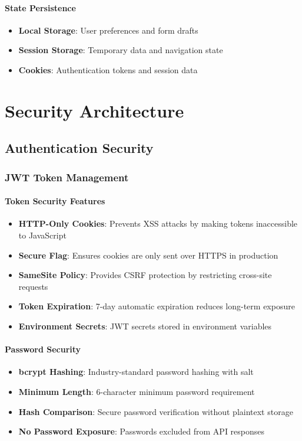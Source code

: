 \documentclass[12pt,a4paper]{article}
\begin{document}
\paragraph{State Persistence}
\begin{itemize}
\item \textbf{Local Storage}: User preferences and form drafts
\item \textbf{Session Storage}: Temporary data and navigation state
\item \textbf{Cookies}: Authentication tokens and session data
\end{itemize}

\section{Security Architecture}
\label{sec:security-architecture}

\subsection{Authentication Security}
\label{subsec:auth-security}

\subsubsection{JWT Token Management}
\label{subsubsec:jwt-security}

\paragraph{Token Security Features}
\begin{itemize}
\item \textbf{HTTP-Only Cookies}: Prevents XSS attacks by making tokens inaccessible to JavaScript
\item \textbf{Secure Flag}: Ensures cookies are only sent over HTTPS in production
\item \textbf{SameSite Policy}: Provides CSRF protection by restricting cross-site requests
\item \textbf{Token Expiration}: 7-day automatic expiration reduces long-term exposure
\item \textbf{Environment Secrets}: JWT secrets stored in environment variables
\end{itemize}

\paragraph{Password Security}
\begin{itemize}
\item \textbf{bcrypt Hashing}: Industry-standard password hashing with salt
\item \textbf{Minimum Length}: 6-character minimum password requirement
\item \textbf{Hash Comparison}: Secure password verification without plaintext storage
\item \textbf{No Password Exposure}: Passwords excluded from API responses
\end{itemize}
\end{document}
